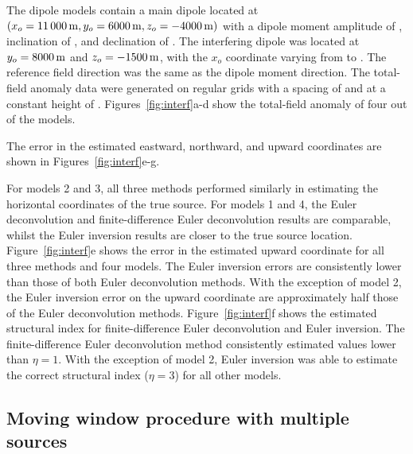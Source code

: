 The dipole models contain a main dipole located at $(x_o=\SynInterfTrueEast,
y_o=\SynInterfTrueNorth, z_o=\SynInterfTrueUp)$ with a dipole moment amplitude
of \SynInterfInt{}, inclination of \SynInterfInc, and declination of
\SynInterfDec.
The interfering dipole was located at $y_o=\SynInterfInterfNorth$ and
$z_o=\SynInterfInterfUp$, with the $x_o$ coordinate varying from
\SynInterfInterfEastMin{} to \SynInterfInterfEastMax{}.
The reference field direction was the same as the dipole moment direction.
The total-field anomaly data were generated on regular grids with a spacing of
\SynInterfSpacing{} and at a constant height of \SynInterfHeight.
Figures~\ref{fig:interf}a-d show the total-field anomaly of four out of the
\SynInterfNModels{} models.

The error in the estimated eastward, northward, and upward coordinates are
shown in Figures~\ref{fig:interf}e-g.

For models 2 and 3, all three methods performed similarly in estimating the horizontal coordinates of the true source.
For models 1 and 4, the Euler deconvolution and finite-difference Euler deconvolution results are comparable, whilst the Euler inversion results are closer to the true source location.
Figure~\ref{fig:interf}e shows the error in the estimated upward coordinate for all three methods and four models.
The Euler inversion errors are consistently lower than those of both Euler deconvolution methods.
With the exception of model 2, the Euler inversion error on the upward coordinate are approximately half those of the Euler deconvolution methods.
Figure~\ref{fig:interf}f shows the estimated structural index for finite-difference Euler deconvolution and Euler inversion.
The finite-difference Euler deconvolution method consistently estimated values lower than $\eta=1$.
With the exception of model 2, Euler inversion was able to estimate the correct structural index ($\eta=3$) for all other models.


\subsection{Moving window procedure with multiple sources}
\label{sec:windows}

